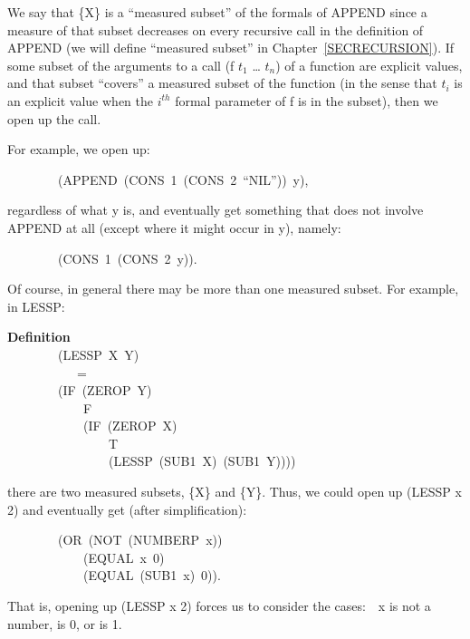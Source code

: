 \documentclass[10pt]{book}
\newenvironment{pubasis}{\begin{flushleft}}{\end{flushleft}}
\newcommand{\axiomordefinition}[1]{\vspace{6pt}\Large\textsf{\textbf{#1}}\normalsize}
\begin{document}
We say that \{X\} is a ``measured subset'' of the formals of APPEND
since a measure of that subset decreases on every recursive call in the definition
of APPEND (we will define ``measured subset'' in Chapter~\ref{SECRECURSION}).
If some subset of the arguments to a call (f $t_{1}$ \ldots{} $t_{n}$) of a function are
explicit values, and that subset ``covers'' a measured subset of the function
(in the sense that $t_{i}$ is an explicit value when the $i^{th}$ formal
parameter of f is in the subset),
then we open up the call.

For example, we open up:

\begin{pubasis}
~~~~~~~~(APPEND~(CONS~1~(CONS~2~``NIL''))~y),\\
\end{pubasis}
regardless of what y is, and eventually get something that does not
involve APPEND at all (except where it might occur in y), namely:
\begin{pubasis}
~~~~~~~~(CONS~1~(CONS~2~y)).\\
\end{pubasis}
Of course, in general there may be more than one measured subset.
For example, in LESSP:

\begin{pubasis}
\axiomordefinition{Definition}\\
~~~~~~~~(LESSP~X~Y)\\
~~~~~~~~~~~=\\
~~~~~~~~(IF~(ZEROP~Y)\\
~~~~~~~~~~~~F\\
~~~~~~~~~~~~(IF~(ZEROP~X)\\
~~~~~~~~~~~~~~~~T\\
~~~~~~~~~~~~~~~~(LESSP~(SUB1~X)~(SUB1~Y))))\\
\end{pubasis}
there are two measured subsets, \{X\} and \{Y\}.  Thus,
we could open up (LESSP x 2) and eventually get (after simplification):

\begin{pubasis}
~~~~~~~~(OR~(NOT~(NUMBERP~x))\\
~~~~~~~~~~~~(EQUAL~x~0)\\
~~~~~~~~~~~~(EQUAL~(SUB1~x)~0)).\\
\end{pubasis}
That is, opening up (LESSP x 2) forces us to
consider the cases:~~x is not a number, is 0, or is 1.
\end{document}
